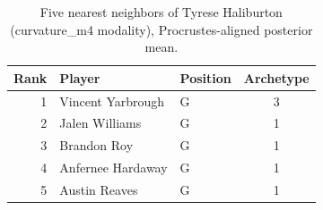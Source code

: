 \begin{table}[htbp]
  \centering\small
  \begin{tabular}{rllc}
    \toprule
    Rank & Player & Position & Archetype \\
    \midrule
    1 & Vincent Yarbrough & G & 3 \\
    2 & Jalen Williams & G & 1 \\
    3 & Brandon Roy & G & 1 \\
    4 & Anfernee Hardaway & G & 1 \\
    5 & Austin Reaves & G & 1 \\
    \bottomrule
  \end{tabular}
  \caption{Five nearest neighbors of Tyrese Haliburton (curvature_m4 modality), Procrustes-aligned posterior mean.}
  \label{tab:Tyrese_Haliburton_neighbors_curvature_m4}
\end{table}

